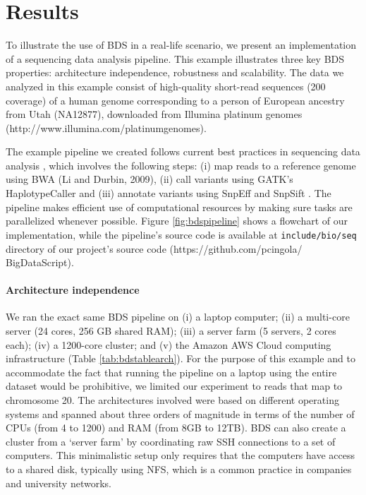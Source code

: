 \section{Results}

To illustrate the use of BDS in a real-life scenario, we present an implementation of a sequencing data analysis pipeline. This example illustrates three key BDS properties: architecture independence, robustness and scalability. The data we analyzed in this example consist of high-quality short-read sequences (200 coverage) of a human genome corresponding to a person of European ancestry from Utah (NA12877), downloaded from Illumina platinum genomes (http://www.illumina.com/platinumgenomes).

The example pipeline we created follows current best practices in sequencing data analysis \cite{mckenna2010genome}, which involves the following steps: (i) map reads to a reference genome using BWA (Li and Durbin, 2009), (ii) call variants using GATK’s HaplotypeCaller and (iii) annotate variants using SnpEff \cite{cingolani2012program} and SnpSift \cite{cingolani2012using}. The pipeline makes efficient use of computational resources by making sure tasks are parallelized whenever possible. Figure \ref{fig:bdspipeline} shows a flowchart of our implementation, while the pipeline’s source code is available at \texttt{include/bio/seq} directory of our project’s source code (https://github.com/pcingola/ BigDataScript).


\paragraph{Architecture independence} We ran the exact same BDS pipeline on (i) a laptop computer; (ii) a multi-core server (24 cores, 256 GB shared RAM); (iii) a server farm (5 servers, 2 cores each); (iv) a 1200-core cluster; and (v) the Amazon AWS Cloud computing infrastructure (Table \ref{tab:bdstablearch}). For the purpose of this example and to accommodate the fact that running the pipeline on a laptop using the entire dataset would be prohibitive, we limited our experiment to reads that map to chromosome 20. The architectures involved were based on different operating systems and spanned about three orders of magnitude in terms of the number of CPUs (from 4 to 1200) and RAM (from 8GB to 12TB). BDS can also create a cluster from a ‘server farm’ by coordinating raw SSH connections to a set of computers. This minimalistic setup only requires that the computers have access to a shared disk, typically using NFS, which is a common practice in companies and university networks.

